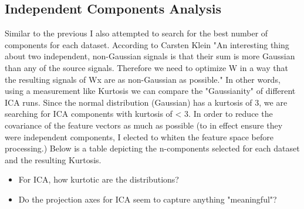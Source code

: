 \subsection{Independent Components Analysis}\label{subsec:independent-components-analysis}
Similar to the previous I also attempted to search for the best number of components for each dataset.
According to Carsten Klein\cite{klein_2019}
"An interesting thing about two independent, non-Gaussian signals is that their sum is more Gaussian than any of the source signals.
Therefore we need to optimize W in a way that the resulting signals of Wx are as non-Gaussian as possible."
In other words, using a measurement like Kurtosis we can compare the "Gaussianity" of different ICA runs.
Since the normal distribution (Gaussian) has a kurtosis of 3, we are searching for ICA components with kurtosis of < 3.
In order to reduce the covariance of the feature vectors as much as possible (to in effect ensure they were independent
components, I elected to whiten the feature space before processing.)
Below is a table depicting the n-components selected for each dataset and the resulting Kurtosis.
\begin{itemize}
    \item For ICA, how kurtotic are the distributions?
    \item Do the projection axes for ICA seem to capture anything "meaningful"?
\end{itemize}

